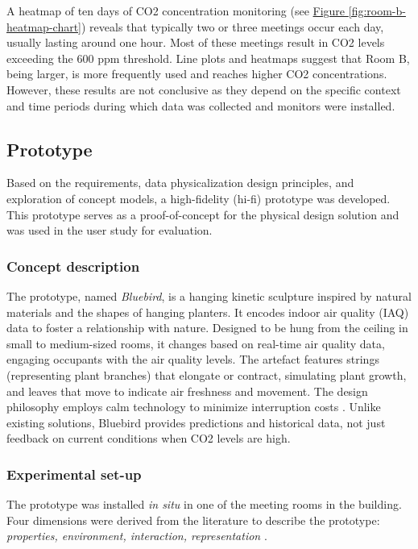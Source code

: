 A heatmap of ten days of CO2 concentration monitoring (see \hyperref[fig:room-b-heatmap-chart]{Figure \ref*{fig:room-b-heatmap-chart}}) reveals that typically two or three meetings occur each day, usually lasting around one hour. Most of these meetings result in CO2 levels exceeding the 600 ppm threshold. Line plots and heatmaps suggest that Room B, being larger, is more frequently used and reaches higher CO2 concentrations. However, these results are not conclusive as they depend on the specific context and time periods during which data was collected and monitors were installed.



\subsection{Prototype}
\label{sec:prototype_results}

Based on the requirements, data physicalization design principles, and exploration of concept models, a high-fidelity (hi-fi) prototype was developed. This prototype serves as a proof-of-concept for the physical design solution and was used in the user study for evaluation.

\subsubsection{Concept description}

The prototype, named \textit{Bluebird}, is a hanging kinetic sculpture inspired by natural materials and the shapes of hanging planters. It encodes indoor air quality (IAQ) data to foster a relationship with nature. Designed to be hung from the ceiling in small to medium-sized rooms, it changes based on real-time air quality data, engaging occupants with the air quality levels. The artefact features strings (representing plant branches) that elongate or contract, simulating plant growth, and leaves that move to indicate air freshness and movement. The design philosophy employs calm technology to minimize interruption costs \cite{case_calm_2016}. Unlike existing solutions, Bluebird provides predictions and historical data, not just feedback on current conditions when CO2 levels are high.

\subsubsection{Experimental set-up}

The prototype was installed \textit{in situ} in one of the meeting rooms in the building. Four dimensions were derived from the literature to describe the prototype: \textit{properties, environment, interaction, representation} \cite{sauve_physecology_2022, hornecker_design_2023, anhalt_university_germany_design_2022}.

